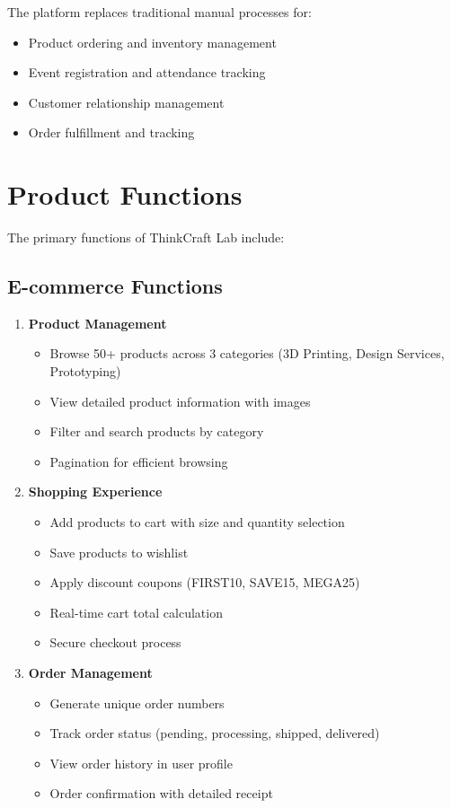 \documentclass{scrreprt}
\begin{document}
The platform replaces traditional manual processes for:
\begin{itemize}
\item Product ordering and inventory management
\item Event registration and attendance tracking
\item Customer relationship management
\item Order fulfillment and tracking
\end{itemize}

\section{Product Functions}
The primary functions of ThinkCraft Lab include:

\subsection{E-commerce Functions}
\begin{enumerate}
\item \textbf{Product Management}
\begin{itemize}
\item Browse 50+ products across 3 categories (3D Printing, Design Services, Prototyping)
\item View detailed product information with images
\item Filter and search products by category
\item Pagination for efficient browsing
\end{itemize}

\item \textbf{Shopping Experience}
\begin{itemize}
\item Add products to cart with size and quantity selection
\item Save products to wishlist
\item Apply discount coupons (FIRST10, SAVE15, MEGA25)
\item Real-time cart total calculation
\item Secure checkout process
\end{itemize}

\item \textbf{Order Management}
\begin{itemize}
\item Generate unique order numbers
\item Track order status (pending, processing, shipped, delivered)
\item View order history in user profile
\item Order confirmation with detailed receipt
\end{itemize}
\end{enumerate}
\end{document}
